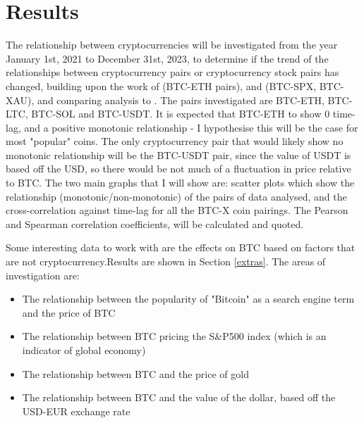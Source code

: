 \documentclass[a4paper, 10pt, conference]{ieeeconf}      %
\begin{document}
\section{Results}
The relationship between cryptocurrencies will be investigated from the year January 1st, 2021 to December 31st, 2023, to determine if the trend of the relationships between cryptocurrency pairs or cryptocurrency stock pairs has changed, building upon the work of \cite{Sifat2019} (BTC-ETH pairs), and \cite{Georgoula2015} (BTC-SPX, BTC-XAU), and comparing analysis to \cite{Corbet2020contagion}. The pairs investigated are BTC-ETH, BTC-LTC, BTC-SOL and BTC-USDT. It is expected that BTC-ETH to show 0 time-lag, and a positive monotonic relationship - I hypothesise this will be the case for most "popular" coins. The only cryptocurrency pair that would likely show no monotonic relationship will be the BTC-USDT pair, since the value of USDT is based off the USD, so there would be not much of a fluctuation in price relative to BTC. The two main graphs that I will show are: scatter plots which show the relationship (monotonic/non-monotonic) of the pairs of data analysed, and the cross-correlation against time-lag for all the BTC-X coin pairings. The Pearson and Spearman correlation coefficients,  will be calculated and quoted.

Some interesting data to work with are the effects on BTC based on factors that are not cryptocurrency.Results are shown in Section \ref{extras}. The areas of investigation are:
\begin{itemize}
    \item The relationship between the popularity of "Bitcoin" as a search engine term and the price of BTC
    \item The relationship between BTC pricing the S\&P500 index (which is an indicator of global economy)
    \item The relationship between BTC and the price of gold
    \item The relationship between BTC and the value of the dollar, based off the USD-EUR exchange rate \cite{Georgoula2015}
\end{itemize}
\end{document}
